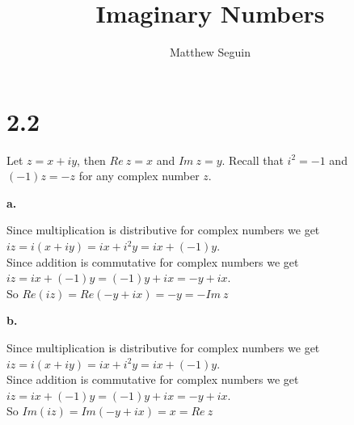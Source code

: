 \documentclass{article}
\title{Imaginary Numbers}
\author{Matthew Seguin}
\date{}
\begin{document}
\maketitle

\section*{2.2}
Let $z = x + iy$, then $Re\:z = x$ and $Im\:z = y$. Recall that $i^2 = -1$ and $(-1)z = -z$ for any complex number $z$.

{\Large\textbf{a.}}
\begin{center}
    \doublespacing
    Since multiplication is distributive for complex numbers we get $iz = i(x + iy) = ix + i^2 y = ix + (-1)y$.
    \\Since addition is commutative for complex numbers we get $iz = ix + (-1)y = (-1)y + ix = -y + ix$.
    \\So $Re(iz) = Re(-y + ix) = -y = -Im\:z$ \qedsymbol
\end{center}

{\Large\textbf{b.}}
\begin{center}
    \doublespacing
    Since multiplication is distributive for complex numbers we get $iz = i(x + iy) = ix + i^2 y = ix + (-1)y$.
    \\Since addition is commutative for complex numbers we get $iz = ix + (-1)y = (-1)y + ix = -y + ix$.
    \\So $Im(iz) = Im(-y + ix) = x = Re\:z$ \qedsymbol
\end{center}
\end{document}
